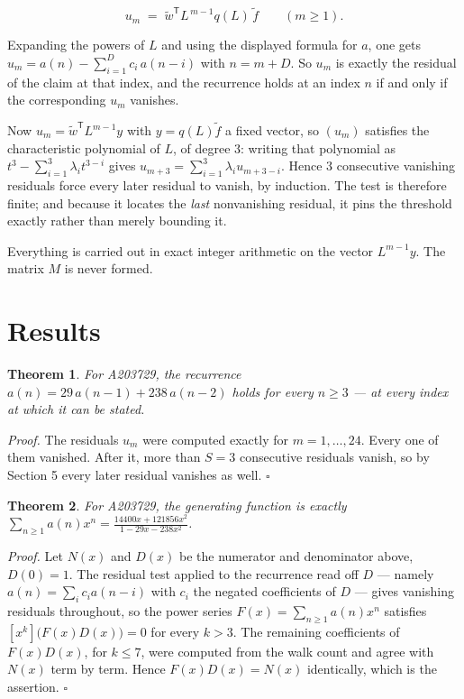 \documentclass[11pt]{article}
\newtheorem{theorem}{Theorem}
\theoremstyle{definition}
\begin{document}
\[u_m \;=\; \tilde w^{\mathsf T} L^{\,m-1} q(L)\,\tilde f \qquad (m \ge 1).\]

Expanding the powers of $L$ and using the displayed formula for $a$, one gets $u_m = a(n) - \sum_{i=1}^{D} c_i\,a(n-i)$ with $n = m + D$. So $u_m$ is exactly the residual of the claim at that index, and the recurrence holds at an index $n$ if and only if the corresponding $u_m$ vanishes.

Now $u_m = \tilde w^{\mathsf T} L^{m-1} y$ with $y = q(L)\tilde f$ a fixed vector, so $(u_m)$ satisfies the characteristic polynomial of $L$, of degree $3$: writing that polynomial as $t^{3} - \sum_{i=1}^{3} \lambda_i t^{3-i}$ gives $u_{m+3} = \sum_{i=1}^{3} \lambda_i u_{m+3-i}$. Hence $3$ consecutive vanishing residuals force every later residual to vanish, by induction. The test is therefore finite; and because it locates the {\itshape last} nonvanishing residual, it pins the threshold exactly rather than merely bounding it.

Everything is carried out in exact integer arithmetic on the vector $L^{m-1}y$. The matrix $M$ is never formed.

\section{Results}

\begin{theorem} For A203729, the recurrence $a(n) = 29\,a(n-1) + 238\,a(n-2)$ holds for every $n \ge 3$ --- at every index at which it can be stated.\end{theorem}

{\itshape Proof.} The residuals $u_m$ were computed exactly for $m = 1,\dots,24$. Every one of them vanished. After it, more than $S = 3$ consecutive residuals vanish, so by Section 5 every later residual vanishes as well. $\square$

\begin{theorem} For A203729, the generating function is exactly $\sum_{n\ge 1} a(n)x^n = \frac{14400x + 121856x^{2}}{1 - 29x - 238x^{2}}$.\end{theorem}

{\itshape Proof.} Let $N(x)$ and $D(x)$ be the numerator and denominator above, $D(0)=1$. The residual test applied to the recurrence read off $D$ --- namely $a(n) = \sum_i c_i a(n-i)$ with $c_i$ the negated coefficients of $D$ --- gives vanishing residuals throughout, so the power series $F(x)=\sum_{n\ge 1}a(n)x^n$ satisfies $[x^k]\bigl(F(x)D(x)\bigr) = 0$ for every $k > 3$. The remaining coefficients of $F(x)D(x)$, for $k \le 7$, were computed from the walk count and agree with $N(x)$ term by term. Hence $F(x)D(x) = N(x)$ identically, which is the assertion. $\square$
\end{document}
